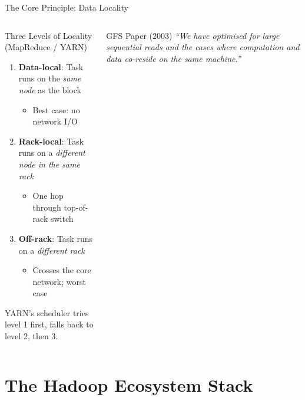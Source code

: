 \documentclass[aspectratio=169,10pt]{beamer}
\begin{document}
\begin{frame}{The Core Principle: Data Locality}
\begin{columns}[T]
      \begin{exampleblock}{Three Levels of Locality (MapReduce / YARN)}
        \vspace{4pt}
        \begin{enumerate}
          \item \textbf{Data-local}: Task runs on the \emph{same node} as the block
          \begin{itemize}
            \scriptsize\item Best case: no network I/O
          \end{itemize}
          \vspace{4pt}
          \item \textbf{Rack-local}: Task runs on a \emph{different node in the same rack}
          \begin{itemize}
            \scriptsize\item One hop through top-of-rack switch
          \end{itemize}
          \vspace{4pt}
          \item \textbf{Off-rack}: Task runs on a \emph{different rack}
          \begin{itemize}
            \scriptsize\item Crosses the core network; worst case
          \end{itemize}
        \end{enumerate}
        \vspace{4pt}
        YARN's scheduler tries level 1 first, falls back to level 2, then 3.
      \end{exampleblock}
      \vspace{4pt}
      \begin{block}{GFS Paper (2003)}
        \textit{``We have optimised for large sequential reads and the cases where computation and data co-reside on the same machine.''}
      \end{block}
  \end{columns}
\end{frame}

\section{The Hadoop Ecosystem Stack}
\end{document}
